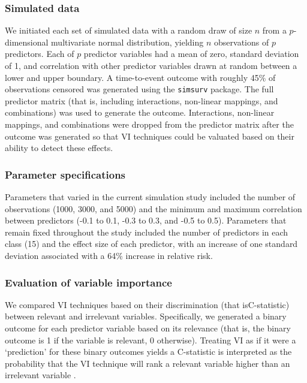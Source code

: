 \documentclass[twoside,11pt]{article}\usepackage[]{graphicx}\usepackage[]{xcolor}
\newcommand{\ie}{that is}
\begin{document}
\subsubsection{Simulated data}

We initiated each set of simulated data with a random draw of size $n$ from a $p$-dimensional multivariate normal distribution, yielding $n$ observations of $p$ predictors. Each of $p$ predictor variables had a mean of zero, standard deviation of 1, and correlation with other predictor variables drawn at random between a lower and upper boundary. A time-to-event outcome with roughly 45\% of observations censored was generated using the \texttt{simsurv} package. The full predictor matrix (\ie, including interactions, non-linear mappings, and combinations) was used to generate the outcome. Interactions, non-linear mappings, and combinations were dropped from the predictor matrix after the outcome was generated so that VI techniques could be valuated based on their ability to detect these effects.

\subsubsection{Parameter specifications}

Parameters that varied in the current simulation study included the number of observations (1000, 3000, and 5000) and the minimum and maximum correlation between predictors (-0.1 to 0.1, -0.3 to 0.3, and -0.5 to 0.5). Parameters that remain fixed throughout the study included the number of predictors in each class (15) and the effect size of each predictor, with an increase of one standard deviation associated with a 64\% increase in relative risk.

\subsubsection{Evaluation of variable importance}

We compared VI techniques based on their discrimination (\ie C-statistic) between relevant and irrelevant variables. Specifically, we generated a binary outcome for each predictor variable based on its relevance (\ie, the binary outcome is 1 if the variable is relevant, 0 otherwise). Treating VI as if it were a ‘prediction’ for these binary outcomes yields a C-statistic is interpreted as the probability that the VI technique will rank a relevant variable higher than an irrelevant variable \citep{harrell1982evaluating}.
\end{document}
